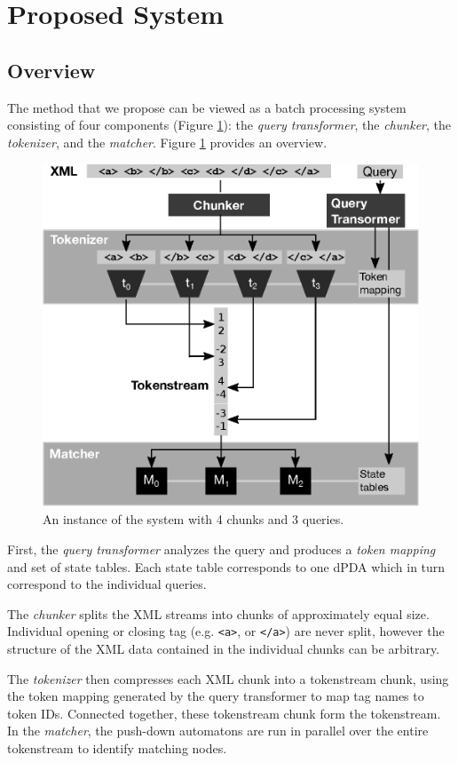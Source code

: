 \section{Proposed System}\label{sec:yourmethod}

\subsection{Overview}
The method that we propose can be viewed as a batch processing system consisting
of four components (Figure \ref{fig:methodoverview}): the \emph{query
transformer}, the \emph{chunker}, the \emph{tokenizer}, and the \emph{matcher}.
Figure \ref{fig:methodoverview} provides an overview.

\begin{figure}[tb]\centering
	\includegraphics[width=.5\textwidth]{img/methodoverview.eps}
  \caption{An instance of the system with 4 chunks and 3 queries.}
  \label{fig:methodoverview}
\end{figure}

First, the \emph{query transformer} analyzes the query and produces a
\emph{token mapping} and set of state tables. Each state table corresponds to
one dPDA which in turn correspond to the individual queries.

The \emph{chunker} splits the XML streams into chunks of approximately equal
size. Individual opening or closing tag (e.g. \verb;<a>;, or \verb;</a>;) are
never split, however the structure of the XML data contained in the individual
chunks can be arbitrary.

The \emph{tokenizer} then compresses each XML chunk into a tokenstream chunk,
using the token mapping generated by the query transformer to map tag names to
token IDs. Connected together, these tokenstream chunk form the tokenstream. In
the \emph{matcher}, the push-down automatons are run in parallel over the
entire tokenstream to identify matching nodes.

